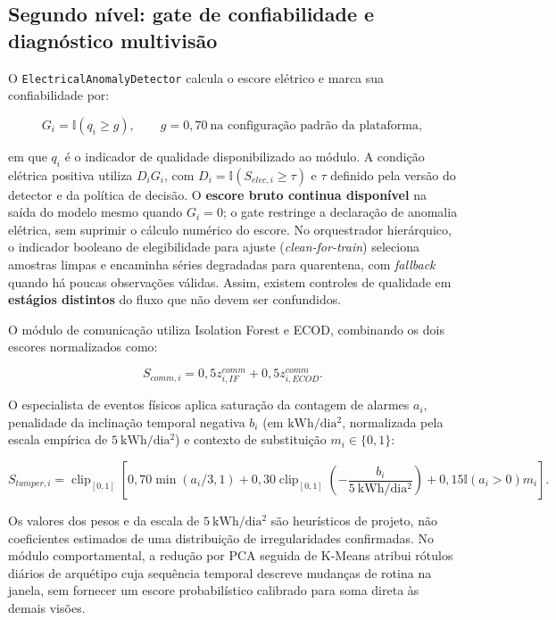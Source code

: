 \subsection{Segundo nível: gate de confiabilidade e diagnóstico multivisão}\label{segundo-nuxedvel-gate-de-confiabilidade-e-diagnuxf3stico-multivisuxe3o}

O \texttt{ElectricalAnomalyDetector} calcula o escore elétrico e marca sua confiabilidade por:

\[G_i=\mathbb{I}(q_i\ge g),\qquad g=0{,}70\ \text{na configuração padrão da plataforma},\]

em que \(q_i\) é o indicador de qualidade disponibilizado ao módulo. A condição elétrica positiva utiliza \(D_iG_i\), com \(D_i=\mathbb{I}(S_{elec,i}\ge\tau)\) e \(\tau\) definido pela versão do detector e da política de decisão. O \textbf{escore bruto continua disponível} na saída do modelo mesmo quando \(G_i=0\); o gate restringe a declaração de anomalia elétrica, sem suprimir o cálculo numérico do escore. No orquestrador hierárquico, o indicador booleano de elegibilidade para ajuste (\emph{clean-for-train}) seleciona amostras limpas e encaminha séries degradadas para quarentena, com \emph{fallback} quando há poucas observações válidas. Assim, existem controles de qualidade em \textbf{estágios distintos} do fluxo que não devem ser confundidos.

O módulo de comunicação utiliza Isolation Forest e ECOD, combinando os dois escores normalizados como:

\[S_{comm,i}=0{,}5z_{i,IF}^{comm}+0{,}5z_{i,ECOD}^{comm}.\]

O especialista de eventos físicos aplica saturação da contagem de alarmes \(a_i\), penalidade da inclinação temporal negativa \(b_i\) (em \(\mathrm{kWh/dia^2}\), normalizada pela escala empírica de \(5\ \mathrm{kWh/dia^2}\)) e contexto de substituição \(m_i\in\{0,1\}\):

\[S_{tamper,i}=\operatorname{clip}_{[0,1]}\!\left[0{,}70\min(a_i/3,1)+0{,}30\operatorname{clip}_{[0,1]}\!\left(-\frac{b_i}{5\ \mathrm{kWh/dia^2}}\right)+0{,}15\mathbb{I}(a_i>0)m_i\right].\]

Os valores dos pesos e da escala de \(5\ \mathrm{kWh/dia^2}\) são heurísticos de projeto, não coeficientes estimados de uma distribuição de irregularidades confirmadas. No módulo comportamental, a redução por PCA seguida de K-Means atribui rótulos diários de arquétipo cuja sequência temporal descreve mudanças de rotina na janela, sem fornecer um escore probabilístico calibrado para soma direta às demais visões.

